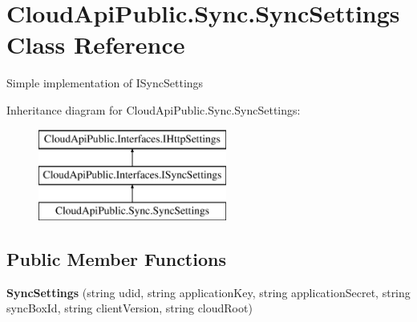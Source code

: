 \hypertarget{class_cloud_api_public_1_1_sync_1_1_sync_settings}{\section{Cloud\-Api\-Public.\-Sync.\-Sync\-Settings Class Reference}
\label{class_cloud_api_public_1_1_sync_1_1_sync_settings}
}


Simple implementation of I\-Sync\-Settings  


Inheritance diagram for Cloud\-Api\-Public.\-Sync.\-Sync\-Settings\-:\begin{figure}[H]
\begin{center}
\leavevmode
\includegraphics[height=3.000000cm]{class_cloud_api_public_1_1_sync_1_1_sync_settings}
\end{center}
\end{figure}
\subsection*{Public Member Functions}
\begin{DoxyCompactItemize}
\item 
\hypertarget{class_cloud_api_public_1_1_sync_1_1_sync_settings_a27ca55ebbac0a38f841e0cc4f8204eec}{{\bfseries Sync\-Settings} (string udid, string application\-Key, string application\-Secret, string sync\-Box\-Id, string client\-Version, string cloud\-Root)}\label{class_cloud_api_public_1_1_sync_1_1_sync_settings_a27ca55ebbac0a38f841e0cc4f8204eec}

\end{DoxyCompactItemize}
